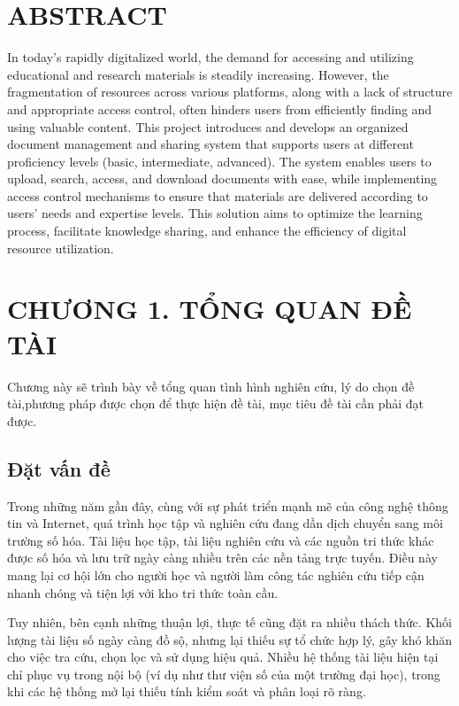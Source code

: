 \documentclass{article}
\begin{document}
	\vspace{2cm}
	
	\section*{ABSTRACT}
	In today's rapidly digitalized world, the demand for accessing and utilizing educational and research materials is steadily increasing. However, the fragmentation of resources across various platforms, along with a lack of structure and appropriate access control, often hinders users from efficiently finding and using valuable content. This project introduces and develops an organized document management and sharing system that supports users at different proficiency levels (basic, intermediate, advanced). The system enables users to upload, search, access, and download documents with ease, while implementing access control mechanisms to ensure that materials are delivered according to users’ needs and expertise levels. This solution aims to optimize the learning process, facilitate knowledge sharing, and enhance the efficiency of digital resource utilization.
	\cleardoublepage
	
	\section*{CHƯƠNG 1. TỔNG QUAN ĐỀ TÀI}
	\setcounter{section}{1}
	\setcounter{subsection}{0}
	\setcounter{figure}{0}
	\setcounter{table}{0}
	
	Chương này sẽ trình bày về tổng quan tình hình nghiên cứu, lý do chọn đề tài,phương pháp được chọn để thực hiện đề tài, mục tiêu đề tài cần phải đạt được.
	
	\subsection{Đặt vấn đề}
	
	Trong những năm gần đây, cùng với sự phát triển mạnh mẽ của công nghệ thông tin và Internet, quá trình học tập và nghiên cứu đang dần dịch chuyển sang môi trường số hóa. Tài liệu học tập, tài liệu nghiên cứu và các nguồn tri thức khác được số hóa và lưu trữ ngày càng nhiều trên các nền tảng trực tuyến. Điều này mang lại cơ hội lớn cho người học và người làm công tác nghiên cứu tiếp cận nhanh chóng và tiện lợi với kho tri thức toàn cầu.
	
	Tuy nhiên, bên cạnh những thuận lợi, thực tế cũng đặt ra nhiều thách thức. Khối lượng tài liệu số ngày càng đồ sộ, nhưng lại thiếu sự tổ chức hợp lý, gây khó khăn cho việc tra cứu, chọn lọc và sử dụng hiệu quả. Nhiều hệ thống tài liệu hiện tại chỉ phục vụ trong nội bộ (ví dụ như thư viện số của một trường đại học), trong khi các hệ thống mở lại thiếu tính kiểm soát và phân loại rõ ràng. 
	
\end{document}
